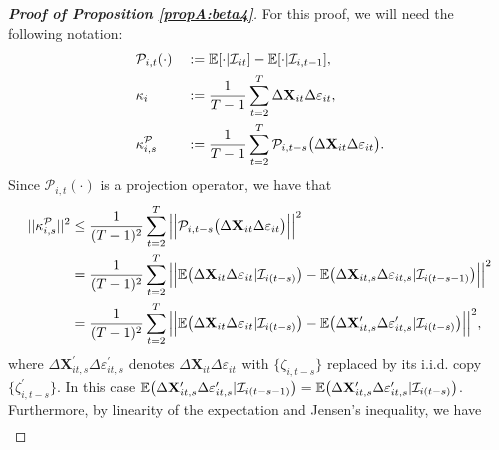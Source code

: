 \documentclass[a4paper,12pt]{article}
\begin{document}
\begin{proof}[\textnormal{\textbf{Proof of Proposition \ref{propA:beta4}}}]
For this proof, we will need the following notation:
\begin{alignat*}{2}
&\mathcal{P}_{i,t}(\cdot) &&:= \mathbb{E}[\cdot|\mathcal{I}_{it}] -\mathbb{E}[\cdot|\mathcal{I}_{i, t-1}], \\
&\kappa_{i} && := \frac{1}{T-1}\sum_{t=2}^T  \Delta \mathbf{X}_{it}\Delta \varepsilon_{it}, \\
&\kappa_{i, s}^{\mathcal{P}} && := \frac{1}{T-1}\sum_{t=2}^T \mathcal{P}_{i, t-s}\big( \Delta \mathbf{X}_{it}\Delta \varepsilon_{it}\big).
\end{alignat*}
Since $\mathcal{P}_{i, t}(\cdot)$ is a projection operator, we have that 
\begin{align*}
||\kappa_{i, s}^{\mathcal{P}}||^2 %
&\leq \frac{1}{(T-1)^2} \sum_{t=2}^T \Big|\Big| \mathcal{P}_{i, t-s}\big( \Delta \mathbf{X}_{it}\Delta \varepsilon_{it}\big) \Big|\Big|^2\\
&= \frac{1}{(T-1)^2} \sum_{t=2}^T \Big|\Big| \ex \big(\Delta \mathbf{X}_{it}\Delta \varepsilon_{it}|\mathcal{I}_{i(t-s)}\big) -\ex \big(\Delta \mathbf{X}_{it, s}\Delta \varepsilon_{it, s}|\mathcal{I}_{i(t-s-1)}\big) \Big|\Big|^2\\
&= \frac{1}{(T-1)^2} \sum_{t=2}^T \Big|\Big| \ex \big(\Delta \mathbf{X}_{it}\Delta \varepsilon_{it}|\mathcal{I}_{i(t-s)}\big) -\ex \big(\Delta \mathbf{X}_{it, s}^\prime\Delta \varepsilon_{it, s}^\prime|\mathcal{I}_{i(t-s)}\big) \Big|\Big|^2,
\end{align*}
where $\Delta \mathbf{X}_{it, s}^\prime\Delta \varepsilon_{it, s}^\prime$ denotes $\Delta \mathbf{X}_{it}\Delta \varepsilon_{it}$ with $\{\zeta_{i, t-s}\}$ replaced by its i.i.d. copy $\{\zeta_{i, t-s}^\prime\}$. In this case $\mathbb{E} \big(\Delta \mathbf{X}_{it, s}^\prime\Delta \varepsilon_{it, s}^\prime|\mathcal{I}_{i(t-s -1)}\big) = \mathbb{E} \big(\Delta \mathbf{X}_{it, s}^\prime\Delta \varepsilon_{it, s}^\prime|\mathcal{I}_{i(t-s)}\big)$. Furthermore, by linearity of the expectation and Jensen's inequality, we have 
\begin{align*}

\end{align*}
\end{proof}
\end{document}
